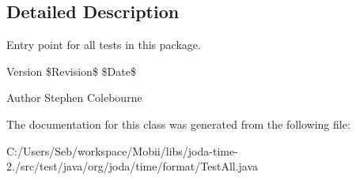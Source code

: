 \subsection{Detailed Description}
Entry point for all tests in this package.

\begin{DoxyVersion}{Version}
\$\-Revision\$ \$\-Date\$
\end{DoxyVersion}
\begin{DoxyAuthor}{Author}
Stephen Colebourne 
\end{DoxyAuthor}


The documentation for this class was generated from the following file\-:\begin{DoxyCompactItemize}
\item 
C\-:/\-Users/\-Seb/workspace/\-Mobii/libs/joda-\/time-\/2./src/test/java/org/joda/time/format/Test\-All.\-java\end{DoxyCompactItemize}
